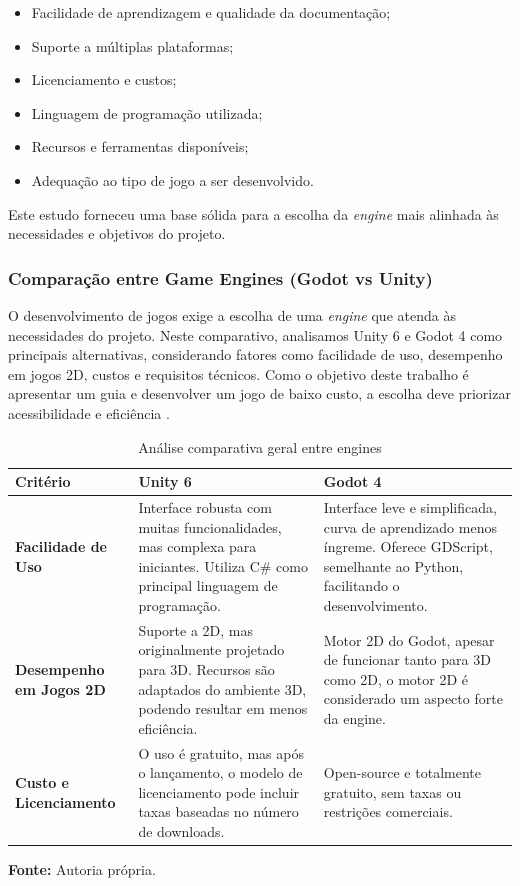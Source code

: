 \begin{itemize}
    \item Facilidade de aprendizagem e qualidade da documentação;
    \item Suporte a múltiplas plataformas;
    \item Licenciamento e custos;
    \item Linguagem de programação utilizada;
    \item Recursos e ferramentas disponíveis;
    \item Adequação ao tipo de jogo a ser desenvolvido.
\end{itemize}

Este estudo forneceu uma base sólida para a escolha da \textit{engine} mais alinhada às necessidades e objetivos do projeto.

\subsubsection{Comparação entre Game Engines (Godot vs Unity)}

O desenvolvimento de jogos exige a escolha de uma \textit{engine} que atenda às necessidades do projeto. Neste comparativo, analisamos Unity 6 e Godot 4 como principais alternativas, considerando fatores como facilidade de uso, desempenho em jogos 2D, custos e requisitos técnicos. Como o objetivo deste trabalho é apresentar um guia e desenvolver um jogo de baixo custo, a escolha deve priorizar acessibilidade e eficiência \cite{godot-sysreq} \cite{unity-sysreq}.

\begin{table}[H]
\centering
\caption{Análise comparativa geral entre engines}
\label{tab:comparacao-engines}
\begin{tabularx}{\textwidth}{|>{\bfseries}l|X|X|}
\hline
\textbf{Critério} & \textbf{Unity 6} & \textbf{Godot 4} \\
\hline
Facilidade de Uso & 
Interface robusta com muitas funcionalidades, mas complexa para iniciantes. Utiliza C\# como principal linguagem de programação. & 
Interface leve e simplificada, curva de aprendizado menos íngreme. Oferece GDScript, semelhante ao Python, facilitando o desenvolvimento. \\
\hline
Desempenho em Jogos 2D & 
Suporte a 2D, mas originalmente projetado para 3D. Recursos são adaptados do ambiente 3D, podendo resultar em menos eficiência. & 
Motor 2D do Godot, apesar de funcionar tanto para 3D como 2D, o motor 2D é considerado um aspecto forte da engine. \\
\hline
Custo e Licenciamento & 
O uso é gratuito, mas após o lançamento, o modelo de licenciamento pode incluir taxas baseadas no número de downloads. & 
Open-source e totalmente gratuito, sem taxas ou restrições comerciais. \\
\hline
\end{tabularx}

\smallskip
\raggedleft \textbf{Fonte:} Autoria própria.
\end{table}

